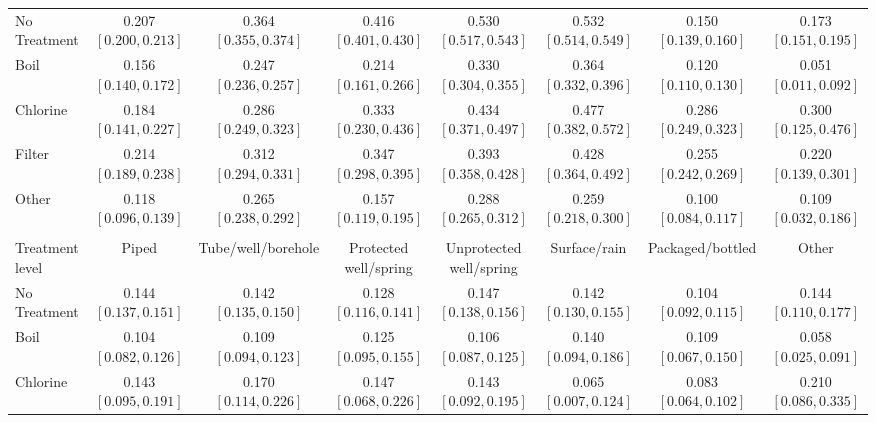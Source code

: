 \begin{table}[p]
\begin{adjustbox}{max width=\linewidth, center}
\begin{tabular}{lccccccc}
\midrule
No Treatment & 0.207 {\scriptsize$[0.200,0.213]$} & 0.364 {\scriptsize$[0.355,0.374]$} & 0.416 {\scriptsize$[0.401,0.430]$} & 0.530 {\scriptsize$[0.517,0.543]$} & 0.532 {\scriptsize$[0.514,0.549]$} & 0.150 {\scriptsize$[0.139,0.160]$} & 0.173 {\scriptsize$[0.151,0.195]$} \\
Boil & 0.156 {\scriptsize$[0.140,0.172]$} & 0.247 {\scriptsize$[0.236,0.257]$} & 0.214 {\scriptsize$[0.161,0.266]$} & 0.330 {\scriptsize$[0.304,0.355]$} & 0.364 {\scriptsize$[0.332,0.396]$} & 0.120 {\scriptsize$[0.110,0.130]$} & 0.051 {\scriptsize$[0.011,0.092]$} \\
Chlorine & 0.184 {\scriptsize$[0.141,0.227]$} & 0.286 {\scriptsize$[0.249,0.323]$} & 0.333 {\scriptsize$[0.230,0.436]$} & 0.434 {\scriptsize$[0.371,0.497]$} & 0.477 {\scriptsize$[0.382,0.572]$} & 0.286 {\scriptsize$[0.249,0.323]$} & 0.300 {\scriptsize$[0.125,0.476]$} \\
Filter & 0.214 {\scriptsize$[0.189,0.238]$} & 0.312 {\scriptsize$[0.294,0.331]$} & 0.347 {\scriptsize$[0.298,0.395]$} & 0.393 {\scriptsize$[0.358,0.428]$} & 0.428 {\scriptsize$[0.364,0.492]$} & 0.255 {\scriptsize$[0.242,0.269]$} & 0.220 {\scriptsize$[0.139,0.301]$} \\
Other & 0.118 {\scriptsize$[0.096,0.139]$} & 0.265 {\scriptsize$[0.238,0.292]$} & 0.157 {\scriptsize$[0.119,0.195]$} & 0.288 {\scriptsize$[0.265,0.312]$} & 0.259 {\scriptsize$[0.218,0.300]$} & 0.100 {\scriptsize$[0.084,0.117]$} & 0.109 {\scriptsize$[0.032,0.186]$} \\
\addlinespace
\multicolumn{8}{l}{\textbf{Panel C: Diarrhea (under-5) (U5)}} \\
Treatment level & Piped & Tube/well/borehole & Protected well/spring & Unprotected well/spring & Surface/rain & Packaged/bottled & Other \\
\midrule
No Treatment & 0.144 {\scriptsize$[0.137,0.151]$} & 0.142 {\scriptsize$[0.135,0.150]$} & 0.128 {\scriptsize$[0.116,0.141]$} & 0.147 {\scriptsize$[0.138,0.156]$} & 0.142 {\scriptsize$[0.130,0.155]$} & 0.104 {\scriptsize$[0.092,0.115]$} & 0.144 {\scriptsize$[0.110,0.177]$} \\
Boil & 0.104 {\scriptsize$[0.082,0.126]$} & 0.109 {\scriptsize$[0.094,0.123]$} & 0.125 {\scriptsize$[0.095,0.155]$} & 0.106 {\scriptsize$[0.087,0.125]$} & 0.140 {\scriptsize$[0.094,0.186]$} & 0.109 {\scriptsize$[0.067,0.150]$} & 0.058 {\scriptsize$[0.025,0.091]$} \\
Chlorine & 0.143 {\scriptsize$[0.095,0.191]$} & 0.170 {\scriptsize$[0.114,0.226]$} & 0.147 {\scriptsize$[0.068,0.226]$} & 0.143 {\scriptsize$[0.092,0.195]$} & 0.065 {\scriptsize$[0.007,0.124]$} & 0.083 {\scriptsize$[0.064,0.102]$} & 0.210 {\scriptsize$[0.086,0.335]$} \\

\end{tabular}
\end{adjustbox}
\end{table}
